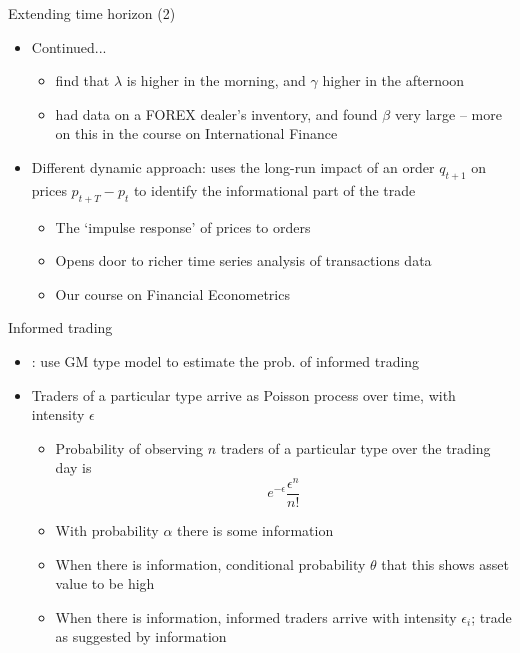 \documentclass[english,10pt]{beamer}
\begin{document}
\begin{frame}{Extending time horizon (2)}
	\begin{itemize}
		\item Continued...
		\begin{itemize}
			\item \citet*{madhavan_why_1997} find that $\lambda$ is higher in the morning, and $\gamma$ higher in the afternoon
			\item \cite{lyons_tests_1995} had data on a FOREX dealer's inventory, and found $\beta$ very large -- more on this in the course on International Finance
		\end{itemize}
		\item Different dynamic approach: \cite{hasbrouck_measuring_1991} uses the long-run impact of an order $q_{t+1}$ on prices $p_{t+T}-p_t$ to identify the informational part of the trade
		\begin{itemize}
			\item The `impulse response' of prices to orders
			\item Opens door to richer time series analysis of transactions data
			\item Our course on Financial Econometrics
		\end{itemize}
	\end{itemize}
\end{frame}


\begin{frame}{Informed trading}
	\begin{itemize}
		\item \citet*{easley_liquidity_1996}: use GM type model to estimate the prob. of informed trading
		\item Traders of a particular type arrive as Poisson process over time, with intensity $\epsilon$
		\begin{itemize}
			\item Probability of observing $n$ traders of a particular type over the trading day is
			\[
			e^{-\epsilon} \frac{\epsilon^n}{n!}
			\]
			\item With probability $\alpha$ there is some information
			\item When there is information, conditional probability $\theta$ that this shows asset value to be high
			\item When there is information, informed traders arrive with intensity $\epsilon_i$; trade as suggested by information
		\end{itemize}
	\end{itemize}
\end{frame}
\end{document}
